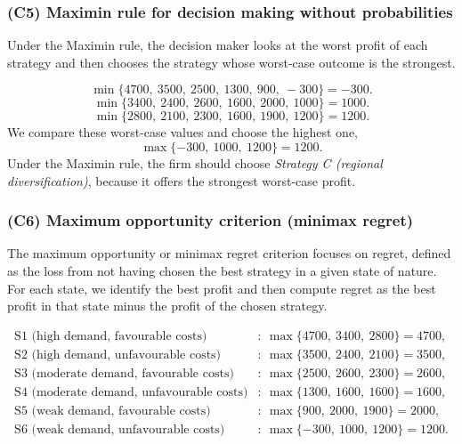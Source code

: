 \documentclass[11pt]{article}
\begin{document}
	\subsubsection{(C5) Maximin rule for decision making without probabilities}\label{subsubsec:example2-c5}
	
	Under the Maximin rule, the decision maker looks at the worst profit of each strategy and then chooses the strategy whose worst-case outcome is the strongest.
	
	\[
	\min\{4700,\ 3500,\ 2500,\ 1300,\ 900,\ -300\}=-300.
	\]
	\[
	\min\{3400,\ 2400,\ 2600,\ 1600,\ 2000,\ 1000\}=1000.
	\]
	\[
	\min\{2800,\ 2100,\ 2300,\ 1600,\ 1900,\ 1200\}=1200.
	\]
	We compare these worst-case values and choose the highest one,
	\[
	\max\{-300,\ 1000,\ 1200\}=1200.
	\]
	Under the Maximin rule, the firm should choose \emph{Strategy C (regional diversification)}, because it offers the strongest worst-case profit.
	
	\subsubsection{(C6) Maximum opportunity criterion (minimax regret)}\label{subsubsec:example2-c6}
	
	The maximum opportunity or minimax regret criterion focuses on regret, defined as the loss from not having chosen the best strategy in a given state of nature. For each state, we identify the best profit and then compute regret as the best profit in that state minus the profit of the chosen strategy.
	
	\[
	\begin{aligned}
		\text{S1 (high demand, favourable costs)} &:\ \max\{4700,\ 3400,\ 2800\}=4700,\\
		\text{S2 (high demand, unfavourable costs)} &:\ \max\{3500,\ 2400,\ 2100\}=3500,\\
		\text{S3 (moderate demand, favourable costs)} &:\ \max\{2500,\ 2600,\ 2300\}=2600,\\
		\text{S4 (moderate demand, unfavourable costs)} &:\ \max\{1300,\ 1600,\ 1600\}=1600,\\
		\text{S5 (weak demand, favourable costs)} &:\ \max\{900,\ 2000,\ 1900\}=2000,\\
		\text{S6 (weak demand, unfavourable costs)} &:\ \max\{-300,\ 1000,\ 1200\}=1200.
	\end{aligned}
	\]
	
\end{document}
